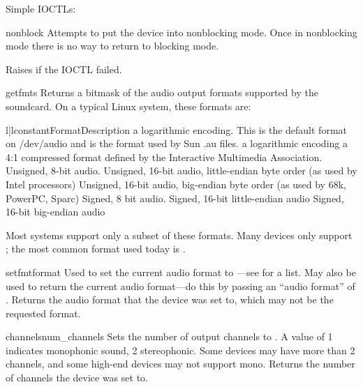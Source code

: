 Simple IOCTLs:

\begin{methoddesc}{nonblock}{}
Attempts to put the device into nonblocking mode.  Once in nonblocking
mode there is no way to return to blocking mode.

Raises  if the IOCTL failed.
\end{methoddesc}

\begin{methoddesc}{getfmts}{}
Returns a bitmask of the audio output formats supported by the
soundcard.  On a typical Linux system, these formats are:

\begin{tableii}{l|l}{constant}{Format}{Description}
       {a logarithmic encoding.  This is the default format on
        /dev/audio and is the format used by Sun .au files.}
       {a logarithmic encoding}
       {a 4:1 compressed format defined by the Interactive Multimedia
        Association.} 
       {Unsigned, 8-bit audio.}
       {Unsigned, 16-bit audio, little-endian byte order (as used by
        Intel processors)}
       {Unsigned, 16-bit audio, big-endian byte order (as used by 68k,
        PowerPC, Sparc)}
       {Signed, 8 bit audio.}
       {Signed, 16-bit little-endian audio}
       {Signed, 16-bit big-endian audio}
\end{tableii}
Most systems support only a subset of these formats.  Many devices only
support ; the most common format used today is
.
\end{methoddesc}

\begin{methoddesc}{setfmt}{format}
Used to set the current audio format to ---see
 for a list.  May also be used to return the current audio
format---do this by passing an ``audio format'' of .
Returns the audio format that the device was set to, which may not be
the requested format.
\end{methoddesc}

\begin{methoddesc}{channels}{num_channels}
Sets the number of output channels to .  A value of 1
indicates monophonic sound, 2 stereophonic.  Some devices may have more
than 2 channels, and some high-end devices may not support mono.
Returns the number of channels the device was set to.
\end{methoddesc}

